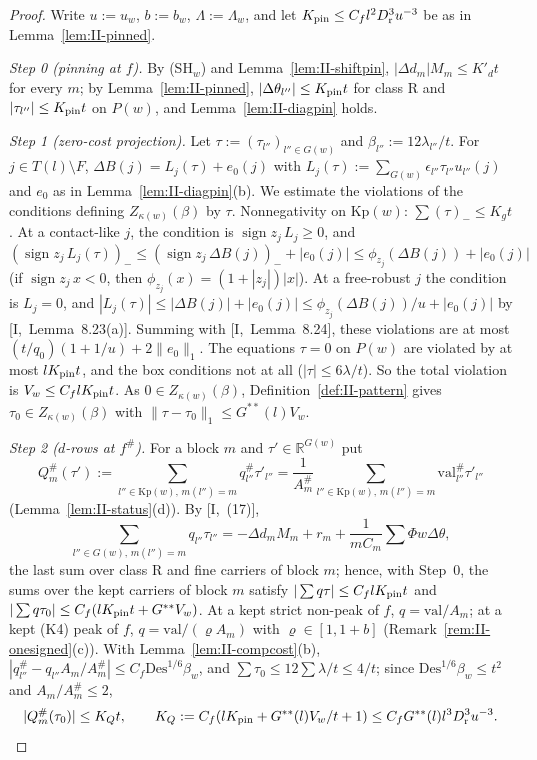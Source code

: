 \documentclass[10pt]{amsart}
\theoremstyle{definition}
\theoremstyle{remark}
\newcommand{\sgn}{\operatorname{sign}}
\newcommand{\R}{\mathbb R}
\begin{document}
\begin{proof}
Write $u:=u_w$, $b:=b_w$, $\Lambda:=\Lambda_w$, and let $K_{\rm pin}\le
C_fl^2D_{\rm r}^3u^{-3}$ be as in Lemma~\ref{lem:II-pinned}.

\emph{Step 0 (pinning at $f$).}  By (SH$_w$) and
Lemma~\ref{lem:II-shiftpin}, $|\Delta d_m|M_m\le K'_dt$ for every $m$; by
Lemma~\ref{lem:II-pinned}, $|\Delta\theta_{l''}|\le K_{\rm pin}t$ for class R
and $|\tau_{l''}|\le K_{\rm pin}t$ on $P(w)$, and
Lemma~\ref{lem:II-diagpin} holds.

\emph{Step 1 (zero-cost projection).}  Let $\tau:=(\tau_{l''})_{l''\in G(w)}$
and $\beta_{l''}:=12\lambda_{l''}/t$.  For $j\in T(l)\setminus F$,
$\Delta B(j)=L_j(\tau)+e_0(j)$ with $L_j(\tau):=\sum_{G(w)}\epsilon_{l''}
\tau_{l''}u_{l''}(j)$ and $e_0$ as in Lemma~\ref{lem:II-diagpin}(b).  We
estimate the violations of the conditions defining $Z_{\kappa(w)}(\beta)$
by $\tau$.  Nonnegativity on $\mathrm{Kp}(w)$: $\sum(\tau)_-\le K_gt$.  At a
contact-like $j$, the condition is $\sgn z_j\,L_j\ge0$, and $(\sgn z_j\,
L_j(\tau))_-\le(\sgn z_j\,\Delta B(j))_-+|e_0(j)|\le\phi_{z_j}(\Delta B(j))+
|e_0(j)|$ (if $\sgn z_j\,x<0$, then $\phi_{z_j}(x)=(1+|z_j|)|x|$).  At a
free-robust $j$ the condition is $L_j=0$, and $|L_j(\tau)|\le|\Delta B(j)|+
|e_0(j)|\le\phi_{z_j}(\Delta B(j))/u+|e_0(j)|$ by [I,~Lemma~8.23(a)].
Summing with [I,~Lemma~8.24], these violations are at most $(t/q_0)(1+1/u)
+2\|e_0\|_1$.  The equations $\tau=0$ on $P(w)$ are violated by at most
$lK_{\rm pin}t$, and the box conditions not at all ($|\tau|\le6\lambda/t$).
So the total violation is $V_w\le C_flK_{\rm pin}t$.  As $0\in
Z_{\kappa(w)}(\beta)$, Definition~\ref{def:II-pattern} gives $\tau_0\in
Z_{\kappa(w)}(\beta)$ with $\|\tau-\tau_0\|_1\le G^{**}(l)V_w$.

\emph{Step 2 ($d$-rows at $f^\#$).}  For a block $m$ and $\tau'\in\R^{G(w)}$
put
\[
 Q^\#_m(\tau'):=\sum_{l''\in\mathrm{Kp}(w),\,m(l'')=m}q^\#_{l''}\tau'_{l''}=
 \frac1{A^\#_m}\sum_{l''\in\mathrm{Kp}(w),\,m(l'')=m}\mathrm{val}^\#_{l''}
 \tau'_{l''}
\]
(Lemma~\ref{lem:II-status}(d)).  By [I,~(17)],
\[
 \sum_{l''\in G(w),\,m(l'')=m}q_{l''}\tau_{l''}=-\Delta d_mM_m+r_m+
 \frac1{mC_m}\sum\Phi w\Delta\theta,
\]
the last sum over class R and fine carriers of block $m$; hence, with
Step~0, the sums over the kept carriers of block $m$ satisfy
$|\sum q\tau|\le C_flK_{\rm pin}t$ and $|\sum q\tau_0|\le C_f(lK_{\rm pin}t+
G^{**}V_w)$.  At a
kept strict non-peak of $f$, $q=\mathrm{val}/A_m$; at a kept (K4) peak of
$f$, $q=\mathrm{val}/(\varrho A_m)$ with $\varrho\in[1,1+b]$
(Remark~\ref{rem:II-onesigned}(c)).  With Lemma~\ref{lem:II-compcost}(b),
$|q^\#_{l''}-q_{l''}A_m/A^\#_m|\le C_f\mathrm{Des}^{1/6}\beta_w$, and
$\sum\tau_0\le12\sum\lambda/t\le4/t$; since $\mathrm{Des}^{1/6}\beta_w\le t^2$
and $A_m/A^\#_m\le2$,
\[
 |Q^\#_m(\tau_0)|\le K_Qt,\qquad K_Q:=C_f(lK_{\rm pin}+G^{**}(l)V_w/t+1)\le
 C_fG^{**}(l)l^3D_{\rm r}^3u^{-3}.
\]


\end{proof}
\end{document}
